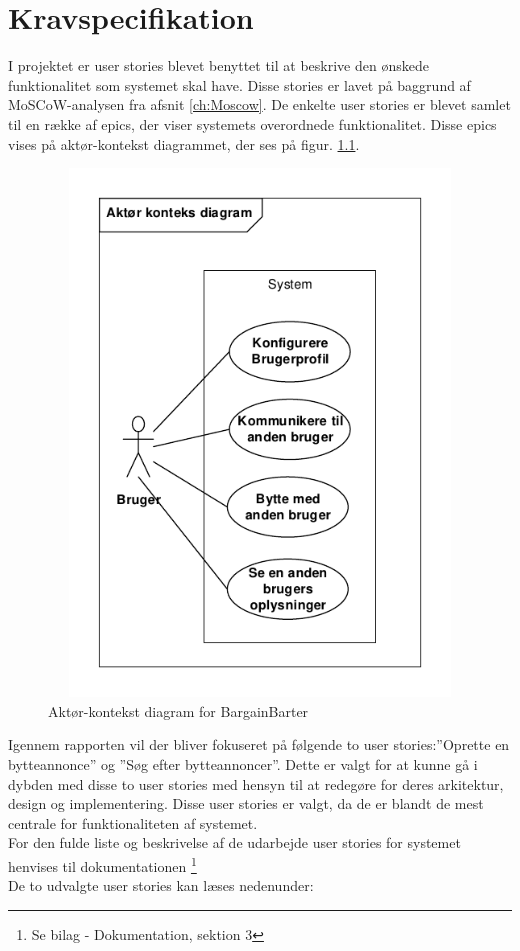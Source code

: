 \chapter{Kravspecifikation}\label{ch:Krav}

I projektet er user stories blevet benyttet til at beskrive den ønskede funktionalitet som systemet skal have. Disse stories er lavet på baggrund af MoSCoW-analysen fra afsnit \ref{ch:Moscow}.
De enkelte user stories er blevet samlet til en række af epics, der viser systemets overordnede funktionalitet. Disse epics vises på aktør-kontekst diagrammet, der ses på figur. \ref{fig:KontekstDia}. 

\begin{figure}[H]
	\includegraphics[width=140mm,height=140mm]{../Dokumentation/figures/KontekstDiagram.PDF}
	\caption{Aktør-kontekst diagram for BargainBarter}
	\label{fig:KontekstDia}
\end{figure}

\noindent Igennem rapporten vil der bliver fokuseret på følgende to user stories:''Oprette en bytteannonce'' og ''Søg efter bytteannoncer''. Dette er valgt for at kunne gå i dybden med disse to user stories med hensyn til at redegøre for deres arkitektur, design og implementering. Disse user stories er valgt, da de er blandt de mest centrale for funktionaliteten af systemet. \\ For den fulde liste og beskrivelse af de udarbejde user stories for systemet henvises til dokumentationen \footnote{Se bilag - Dokumentation, sektion 3}\\
De to udvalgte user stories kan læses nedenunder:

